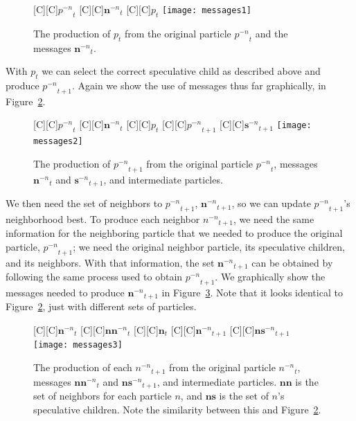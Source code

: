 \documentclass[journal,letterpaper]{IEEEtran}
\newcommand{\fig}[1]{Figure~\ref{fig:#1}}
\providecommand{\nonbest}[1]{\ensuremath{#1^{-n}}}
\providecommand{\p}{\ensuremath{p}}
\providecommand{\sset}{\ensuremath{\mathbf{s}}}
\providecommand{\nsset}{\ensuremath{\mathbf{ns}}}
\providecommand{\n}{\ensuremath{n}}
\providecommand{\nset}{\ensuremath{\mathbf{n}}}
\providecommand{\nnset}{\ensuremath{\mathbf{nn}}}
\begin{document}
\begin{figure}
  \centering
  [C][C]{$\nonbest{\p}_{t}$}
  [C][C]{$\nonbest{\nset}_{t}$}
  [C][C]{$\p_{t}$}
  \texttt{[image: messages1]}
  \caption{The production of $\p_{t}$ from the original particle
  $\nonbest{\p}_{t}$ and the messages $\nonbest{\nset}_{t}$.}
  \label{fig:messages1}
\end{figure}

With $\p_t$ we can select the correct speculative child as described above and
produce $\nonbest{\p}_{t+1}$.  Again we show the use of messages thus far
graphically, in \fig{messages2}.  

\begin{figure}
  \centering
  [C][C]{$\nonbest{\p}_{t}$}
  [C][C]{$\nonbest{\nset}_{t}$}
  [C][C]{$\p_{t}$}
  [C][C]{$\nonbest{\p}_{t+1}$}
  [C][C]{$\nonbest{\sset}_{t+1}$}
  \texttt{[image: messages2]}
  \caption{The production of $\nonbest{\p}_{t+1}$ from the original particle 
  $\nonbest{\p}_{t}$, messages $\nonbest{\nset}_{t}$ and
  $\nonbest{\sset}_{t+1}$, and intermediate particles.}
  \label{fig:messages2}
\end{figure}

We then need the set of neighbors to $\nonbest{\p}_{t+1}$,
$\nonbest{\nset}_{t+1}$, so we can update $\nonbest{\p}_{t+1}$'s neighborhood
best.  To produce each neighbor $\nonbest{\n}_{t+1}$, we need the same
information for the neighboring particle that we needed to produce the original
particle, $\nonbest{\p}_{t+1}$; we need the original neighbor particle, its
speculative children, and its neighbors.  With that information, the set
$\nonbest{\nset}_{t+1}$ can be obtained by following the same process used to
obtain $\nonbest{\p}_{t+1}$.  We graphically show the messages needed to
produce $\nonbest{\nset}_{t+1}$ in \fig{messages3}.  Note that it looks
identical to \fig{messages2}, just with different sets of particles.

\begin{figure}
  \centering
  [C][C]{$\nonbest{\nset}_{t}$}
  [C][C]{$\nonbest{\nnset}_{t}$}
  [C][C]{$\nset_{t}$}
  [C][C]{$\nonbest{\nset}_{t+1}$}
  [C][C]{$\nonbest{\nsset}_{t+1}$}
  \texttt{[image: messages3]}
  \caption{The production of each $\nonbest{\n}_{t+1}$ from the original
  particle $\nonbest{\n}_{t}$, messages $\nonbest{\nnset}_{t}$ and
  $\nonbest{\nsset}_{t+1}$, and intermediate particles.  $\nnset$ is the set of
  neighbors for each particle $\n$, and $\nsset$ is the set of $\n$'s
  speculative children.  Note the similarity between this and \fig{messages2}.}
  \label{fig:messages3}
\end{figure}
\end{document}
